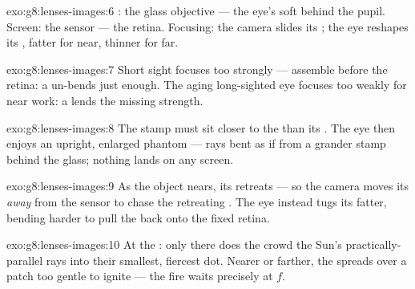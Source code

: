 \begin{solution}{exo:g8:lenses-images:6}
: the glass objective --- the eye's soft  behind the
pupil. Screen: the sensor --- the retina. Focusing: the camera
slides its ; the eye reshapes its , fatter for near,
thinner for far.
\end{solution}

\begin{solution}{exo:g8:lenses-images:7}
Short sight focuses too strongly ---  assemble before
the retina: a  un-bends just enough. The aging
long-sighted eye focuses too weakly for near work: a
 lends the missing strength.
\end{solution}

\begin{solution}{exo:g8:lenses-images:8}
The stamp must sit closer to the  than its .
The eye then enjoys an upright, enlarged phantom --- rays bent
as if from a grander stamp behind the glass; nothing lands on
any screen.
\end{solution}

\begin{solution}{exo:g8:lenses-images:9}
As the object nears, its  retreats --- so the camera
moves its  \emph{away} from the sensor to chase the
retreating . The eye instead tugs its  fatter,
bending harder to pull the  back onto the fixed retina.
\end{solution}

\begin{solution}{exo:g8:lenses-images:10}
At the : only there does the  crowd the Sun's
practically-parallel rays into their smallest, fiercest dot.
Nearer or farther, the  spreads over a patch too gentle
to ignite --- the fire waits precisely at $f$.
\end{solution}

